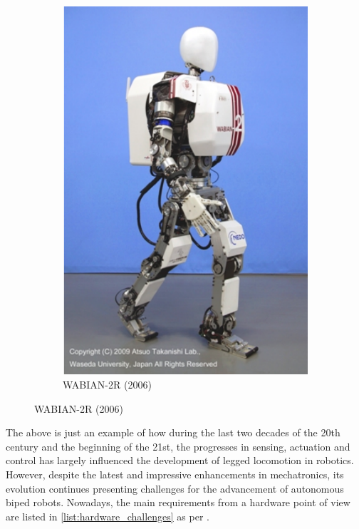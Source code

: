 \begin{figure}[h]
\begin{subfigure}[b]{0.4\textwidth}
        \includegraphics[width=\textwidth]{figures/waseda2.pdf}
        \caption{WABIAN-2R (2006)}
        \label{fig:waseda_robot2}
    \end{subfigure}
\end{figure}

The above is just an example of how during the last two decades of the 20th century and the beginning of the 21st, the progresses in sensing, actuation and control has largely influenced the development of legged locomotion in robotics.
However, despite the latest and impressive enhancements in mechatronics, its evolution continues presenting challenges for the advancement of autonomous biped robots.
Nowadays, the main requirements from a hardware point of view are listed in \ref{list:hardware_challenges} as per \cite{biped_robots_history}.

